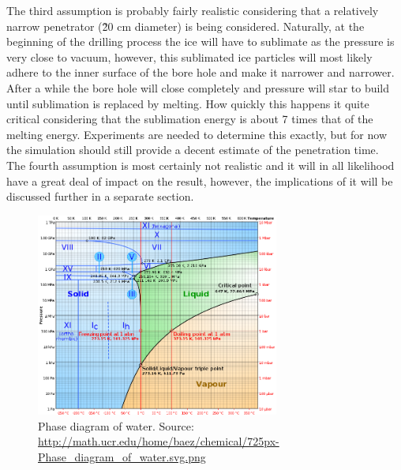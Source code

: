 \noindent
The third assumption is probably fairly realistic considering that a relatively narrow penetrator (\~ 20 cm diameter) is being considered. Naturally, at the beginning of the drilling process the ice will have to sublimate as the pressure is very close to vacuum, however, this sublimated ice particles will most likely adhere to the inner surface of the bore hole and make it narrower and narrower. After a while the bore hole will close completely and pressure will star to build until sublimation is replaced by melting. How quickly this happens it quite critical considering that the sublimation energy is about 7 times\cite{website:engineeringToolbox} that of the melting energy. Experiments are needed to determine this exactly, but for now the simulation should still provide a decent estimate of the penetration time.\\

\noindent
The fourth assumption is most certainly not realistic and it will in all likelihood have a great deal of impact on the result, however, the implications of it will be discussed further in a separate section.

\begin{figure}[ht]
	\centering
	\includegraphics[width=8cm]{figures/LAMC/waterPhase}
	\caption{Phase diagram of water. Source: \url{http://math.ucr.edu/home/baez/chemical/725px-Phase_diagram_of_water.svg.png}}
	\label{fig:waterPhase}
\end{figure}

